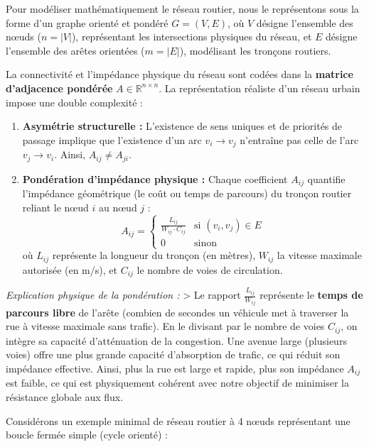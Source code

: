 \documentclass[10pt, a4paper]{article}
\providecommand{\tightlist}{}
\begin{document}
Pour modéliser mathématiquement le réseau routier, nous le représentons
sous la forme d'un graphe orienté et pondéré \(G = (V, E)\), où \(V\)
désigne l'ensemble des nœuds (\(n = |V|\)), représentant les
intersections physiques du réseau, et \(E\) désigne l'ensemble des
arêtes orientées (\(m = |E|\)), modélisant les tronçons routiers.

La connectivité et l'impédance physique du réseau sont codées dans la
\textbf{matrice d'adjacence pondérée} \(A \in \mathbb{R}^{n \times n}\).
La représentation réaliste d'un réseau urbain impose une double
complexité :

\begin{enumerate}
\def\labelenumi{\arabic{enumi}.}
\tightlist
\item
  \textbf{Asymétrie structurelle :} L'existence de sens uniques et de
  priorités de passage implique que l'existence d'un arc \(v_i \to v_j\)
  n'entraîne pas celle de l'arc \(v_j \to v_i\). Ainsi,
  \(A_{ij} \neq A_{ji}\).
\item
  \textbf{Pondération d'impédance physique :} Chaque coefficient
  \(A_{ij}\) quantifie l'impédance géométrique (le coût ou temps de
  parcours) du tronçon routier reliant le nœud \(i\) au nœud \(j\) :
  \[A_{ij} = \begin{cases} \frac{L_{ij}}{W_{ij} \cdot C_{ij}} & \text{si } (v_i, v_j) \in E \\ 0 & \text{sinon} \end{cases}\]
  où \(L_{ij}\) représente la longueur du tronçon (en mètres),
  \(W_{ij}\) la vitesse maximale autorisée (en m/s), et \(C_{ij}\) le
  nombre de voies de circulation.
\end{enumerate}

\emph{Explication physique de la pondération :} \textgreater{} Le
rapport \(\frac{L_{ij}}{W_{ij}}\) représente le \textbf{temps de
parcours libre} de l'arête (combien de secondes un véhicule met à
traverser la rue à vitesse maximale sans trafic). En le divisant par le
nombre de voies \(C_{ij}\), on intègre sa capacité d'atténuation de la
congestion. Une avenue large (plusieurs voies) offre une plus grande
capacité d'absorption de trafic, ce qui réduit son impédance effective.
Ainsi, plus la rue est large et rapide, plus son impédance \(A_{ij}\)
est faible, ce qui est physiquement cohérent avec notre objectif de
minimiser la résistance globale aux flux.

Considérons un exemple minimal de réseau routier à 4 nœuds représentant
une boucle fermée simple (cycle orienté) :
\end{document}
